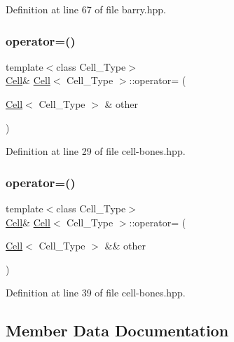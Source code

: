 Definition at line 67 of file barry.\+hpp.

\mbox{\label{class_cell_acf4bbf136ed394887c35cfd4e78f50b9}} 
\subsubsection{\texorpdfstring{operator=()}{operator=()}\hspace{0.1cm}{\footnotesize\ttfamily [1/2]}}
{\footnotesize\ttfamily template$<$class Cell\+\_\+\+Type$>$ \\
\hyperlink{class_cell}{Cell}\& \hyperlink{class_cell}{Cell}$<$ Cell\+\_\+\+Type $>$\+::operator= (\begin{DoxyParamCaption}\item[{\hyperlink{class_cell}{Cell}$<$ Cell\+\_\+\+Type $>$ \&}]{other }\end{DoxyParamCaption})\hspace{0.3cm}{\ttfamily [inline]}}



Definition at line 29 of file cell-\/bones.\+hpp.

\mbox{\label{class_cell_a9bb18ace78fd9010b461c853ccc2c0f7}} 
\subsubsection{\texorpdfstring{operator=()}{operator=()}\hspace{0.1cm}{\footnotesize\ttfamily [2/2]}}
{\footnotesize\ttfamily template$<$class Cell\+\_\+\+Type$>$ \\
\hyperlink{class_cell}{Cell}\& \hyperlink{class_cell}{Cell}$<$ Cell\+\_\+\+Type $>$\+::operator= (\begin{DoxyParamCaption}\item[{\hyperlink{class_cell}{Cell}$<$ Cell\+\_\+\+Type $>$ \&\&}]{other }\end{DoxyParamCaption})\hspace{0.3cm}{\ttfamily [inline]}}



Definition at line 39 of file cell-\/bones.\+hpp.



\subsection{Member Data Documentation}
\mbox{\label{class_cell_a5df1609bc0705830ec4dc6e177ddc955}} 
